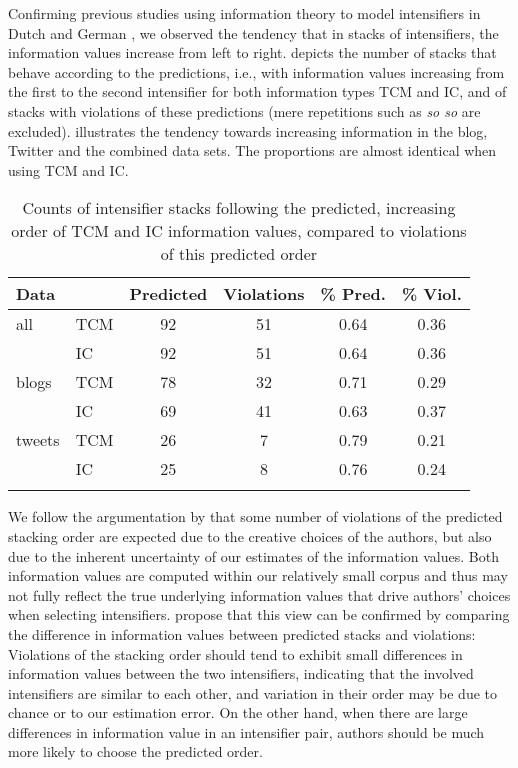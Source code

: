 \documentclass[output=paper,colorlinks,citecolor=brown]{langscibook}
\begin{document}
Confirming previous studies using information theory to model intensifiers in Dutch and German \citep{richter2020ranking, scherihou2022}, we observed the tendency that in stacks of intensifiers, the information values increase from left to right.  depicts  the number of stacks that behave according to the predictions, i.e., with information values increasing from the first to the second intensifier for both information types TCM and IC, and of stacks with violations of these predictions (mere repetitions such as \textit{so so} are excluded).  illustrates the tendency towards increasing information in the blog, Twitter and the combined data sets. The proportions are almost identical when using TCM and IC.


\begin{table}
\begin{tabular}{llcccc}
\lsptoprule
Data    &     & Predicted & Violations & \% Pred. & \% Viol.\\\midrule
all     & TCM &  92 & 51 & 0.64  & 0.36  \\
        &  IC &  92 & 51 & 0.64   & 0.36 \\
blogs   & TCM &  78 & 32 & 0.71   & 0.29 \\
        &  IC &  69 & 41 & 0.63   & 0.37 \\ 
tweets  & TCM &  26 & 7 & 0.79  & 0.21 \\
        &  IC &  25 & 8 & 0.76  & 0.24 \\ 
\lspbottomrule
\end{tabular} 
\caption{Counts of intensifier stacks following the predicted, increasing order of  TCM and IC information values, compared to violations of this predicted order}\label{tab:pred_viol}
\end{table}

We follow the argumentation by \citet{scherihou2022} that some number of violations of the predicted stacking order are expected due to the creative choices of the authors, but also due to the inherent uncertainty of our estimates of the information values. Both information values are computed within our relatively small corpus and thus may not fully reflect the true underlying information values that drive authors' choices when selecting intensifiers. \citet{scherihou2022} propose that this view can be confirmed by comparing the difference in information values between predicted stacks and violations: Violations of the stacking order should tend to exhibit small differences in information values between the two intensifiers, indicating that the involved intensifiers are similar to each other, and variation in their order may be due to chance or to our estimation error. On the other hand, when there are large differences in information value in an  intensifier pair, authors should be much more likely to choose the predicted order.
\end{document}
